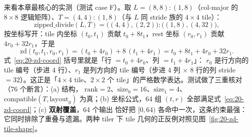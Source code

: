 来看本章最核心的实测（测试 case F）。取 $L=(8,8){:}(1,8)$（col-major 的
$8\times8$ 逻辑矩阵）、$T=(4,4){:}(1,8)$（与 $L$ 同 stride 族的 $4\times4$
tile）：
\begin{equation}
  \mathrm{zipped\_divide}(L,T) = \bigl((4,4),(2,2)\bigr){:}\bigl((1,8),(4,32)\bigr),
  \label{eq:20-zd-example}
\end{equation}
按坐标写开：tile 内坐标 $(t_0,t_1)$ 贡献 $t_0+8t_1$，rest 坐标 $(r_0,r_1)$
贡献 $4r_0+32r_1$，于是
\begin{equation}
  \mathrm{zd}(t_0,t_1,r_0,r_1)
  = (t_0+4r_0) + 8\,(t_1+4r_1)
  = t_0 + 8t_1 + 4r_0 + 32r_1 .
  \label{eq:20-zd-coord}
\end{equation}
式~\eqref{eq:20-zd-coord} 括号里就是「行 $= t_0+4r_0$、列 $= t_1+4r_1$」：
$r_0$ 是行方向的 tile 编号（步进 4 行）、$r_1$ 是列方向的 tile 编号（步进
4 列 $\times$ 8 行的列 stride $=32$）。这正是「$4\times4$ tile、$2\times2$ 个
tile」的严格数学表达。测试做了三重核对（76 个断言）：(a) 结构，
$\mathrm{rank}=2$、$\mathrm{size}_0=16$、$\mathrm{size}_1=4$、
$\mathrm{compatible}(T,\mathrm{layout}_0)$ 为真；(b) 坐标公式，64 组
$(t,r)$ 全部满足式~\eqref{eq:20-zd-coord}；(c) \textbf{双射覆盖}，64 个输出
恰好把 $[0,64)$ 各命中一次，这条约束最强：它同时排除了重叠与遗漏。两种
tiler 下 tile 几何的正反例对照见图~\ref{fig:20-zd-tile-shape}。

